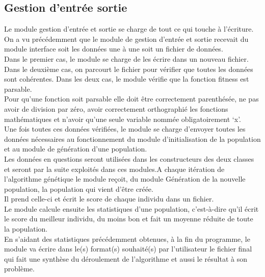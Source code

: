 \documentclass[a4paper,11pt]{article}
\begin{document}
		\subsection{Gestion d'entrée sortie}
			Le module gestion d’entrée et sortie se charge de tout ce qui touche à l’écriture.\\
			On a vu précédemment que le module de gestion d’entrée et sortie recevait du module interface soit les données une à une soit un fichier de données.\\
			Dans le premier cas, le module se charge de les écrire dans un nouveau fichier.\\
			Dans le deuxième cas, on parcourt le fichier pour vérifier que toutes les données sont cohérentes. Dans les deux cas, le module vérifie que la fonction fitness est parsable.\\
			Pour qu’une fonction soit parsable elle doit être correctement parenthésée, ne pas avoir de division par zéro, avoir correctement orthographié les fonctions mathématiques et n’avoir qu’une seule variable nommée obligatoirement ‘x’.\\
			Une fois toutes ces données vérifiées, le module se charge d’envoyer toutes les données nécessaires au fonctionnement du module d’initialisation de la population et au module de génération d’une population. \\
			Les données en questions seront utilisées dans les constructeurs des deux classes et seront par la suite exploités dans ces modules.A chaque itération de l’algorithme génétique le module reçoit, du module Génération de la nouvelle population, la population qui vient d’être créée.\\
			Il prend celle-ci et écrit le score de chaque individu dans un fichier.\\
			Le module calcule ensuite les statistiques d’une population, c’est-à-dire qu’il écrit le score du meilleur individu, du moins bon et fait un moyenne réduite de toute la population.\\
			En s’aidant des statistiques précédemment obtenues, à la fin du programme, le module va écrire dans le(s) format(s) souhaité(s) par l’utilisateur le fichier final qui fait une synthèse du déroulement de l’algorithme et aussi le résultat à son problème.\\
		
\end{document}
